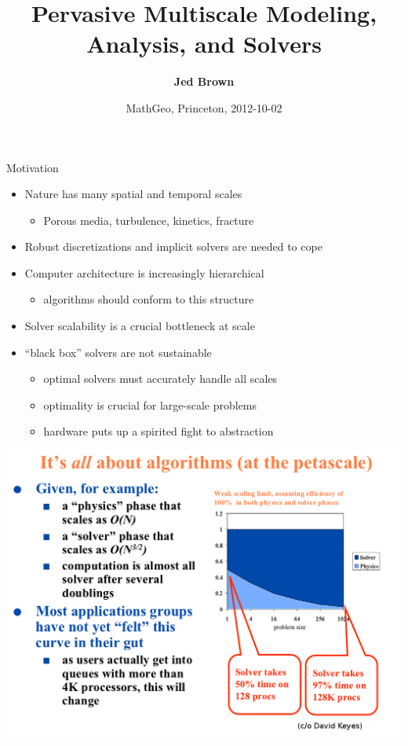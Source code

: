 \documentclass{beamer}
\title{Pervasive Multiscale Modeling, Analysis, and Solvers}
\author{{\bf Jed Brown}}
\institute
{
  {Mathematics and Computer Science Division, Argonne National Laboratory} \\
}
\date{MathGeo, Princeton, 2012-10-02}
\begin{document}
\lstset{language=C}
\normalem

\begin{frame}
  \titlepage
\end{frame}

\begin{frame}{Motivation}
  \begin{itemize}
  \item Nature has many spatial and temporal scales
    \begin{itemize}
    \item Porous media, turbulence, kinetics, fracture
    \end{itemize}
  \item Robust discretizations and implicit solvers are needed to cope
  \item Computer architecture is increasingly hierarchical
    \begin{itemize}
    \item algorithms should conform to this structure
    \end{itemize}
  \item Solver scalability is a crucial bottleneck at scale
  \item ``black box'' solvers are not sustainable
    \begin{itemize}
    \item optimal solvers must accurately handle all scales
    \item optimality is crucial for large-scale problems
    \item hardware puts up a spirited fight to abstraction
    \end{itemize}
  \end{itemize}
\end{frame}

\begin{frame}
  \includegraphics[width=1.05\textwidth]{figures/KeyesAllAboutAlgorithms}
\end{frame}
\end{document}
